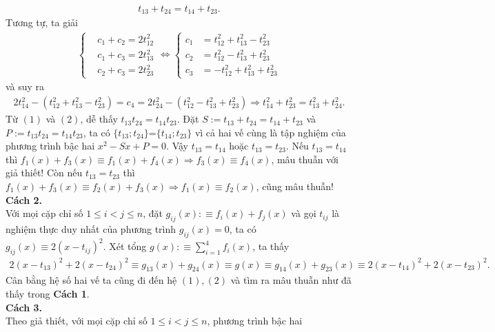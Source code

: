 \begin{bt}
{\begin {align}
		t_{13}+t_{24}=t_{14}+t_{23}.\tag{1}
	\end {align}
	Tương tự, ta giải
	\begin{align*}
	\left\{\begin{aligned}
	&c_{1}+	c_{2} = 2t_{12}^{2} \\
	&c_{1}+	c_{3} = 2t_{13}^{2} \\
	&c_{2}+	c_{3} = 2t_{23}^{2}
	\end{aligned} \right.
	\Leftrightarrow
	\left\{\begin{aligned}
	c_{1} &= t_{12}^{2}+t_{13}^{2}-t_{23}^{2} \\
	c_{2} &= t_{12}^{2}-t_{13}^{2}+t_{23}^{2}\\
	c_{3} &= -t_{12}^{2}+t_{13}^{2}+t_{23}^{2}
	\end{aligned} \right.
	\end{align*} và suy ra
	\begin {align} 2t_{14}^{2}-(t_{12}^{2}+t_{13}^{2}-t_{23}^{2})=c_{4}=2t_{24}^{2}-(t_{12}^{2}-t_{13}^{2}+t_{23}^{2})\Rightarrow t_{14}^{2}+t_{23}^{2}=t_{13}^{2}+t_{24}^{2}. \tag{2}
	\end {align}
	Từ $(1)$ và $(2)$, dễ thấy $t_{13}t_{24}=t_{14}t_{23}$. Đặt $S:=t_{13}+t_{24}=t_{14}+t_{23}$ và $P:=t_{13}t_{24}=t_{14}t_{23}$, ta có $\{t_{13};t_{24}\}$=$\{t_{14};t_{23}\}$ vì cả hai vế cùng là tập nghiệm của phương trình bậc hai $x^{2}-Sx+P=0$. Vậy $t_{13}=t_{14}$ hoặc $t_{13}=t_{23}$. Nếu $t_{13}=t_{14}$ thì $f_{1}(x)+f_{3}(x)\equiv f_{1}(x)+f_{4}(x) \Rightarrow f_{3}(x)\equiv f_{4}(x)$, mâu thuẫn với giả thiết! Còn nếu $t_{13}=t_{23}$ thì $f_{1}(x)+f_{3}(x)\equiv f_{2}(x)+f_{3}(x) \Rightarrow f_{1}(x)\equiv f_{2}(x)$, cũng mâu thuẫn!
	\\
	\textbf{Cách 2.}\\
	Với mọi cặp chỉ số $1\leq i<j \leq n$, đặt $g_{ij}(x):\equiv f_{i}(x)+f_{j}(x)$ và gọi $t_{ij}$ là nghiệm thực duy nhất của phương trình $g_{ij}(x)=0$, ta có $g_{ij}(x)\equiv 2(x-t_{ij})^{2}$. Xét tổng $g(x):\equiv \displaystyle\sum\limits_{i=1}^{4}f_{i}(x)$, ta thấy
	\begin{align*}
	2(x-t_{13})^{2}+2(x-t_{24})^{2}\equiv g_{13}(x)+g_{24}(x)\equiv g(x)\equiv g_{14}(x)+g_{23}(x)\equiv 2(x-t_{14})^{2}+2(x-t_{23})^{2}.
	\end{align*}
	Cân bằng hệ số hai vế ta cũng đi đến hệ $(1),(2)$ và tìm ra mâu thuẫn như đã thấy trong \textbf{Cách 1}.
	\\
	\textbf{Cách 3.}\\
	Theo giả thiết, với mọi cặp chỉ số $1\leq i < j\leq n$, phương trình bậc hai 
}
\end{bt}
